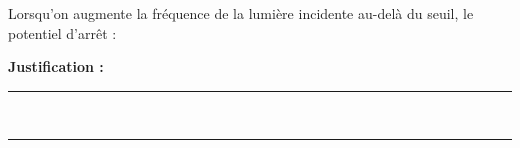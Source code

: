 Lorsqu'on augmente la fréquence de la lumière incidente au-delà du seuil, le potentiel d'arrêt :

\choices

\noindent\textbf{Justification :} \hrulefill \\[2.5ex]
\rule{\linewidth}{0.4pt} \\[2.5ex]
\rule{\linewidth}{0.4pt}
\vfill
